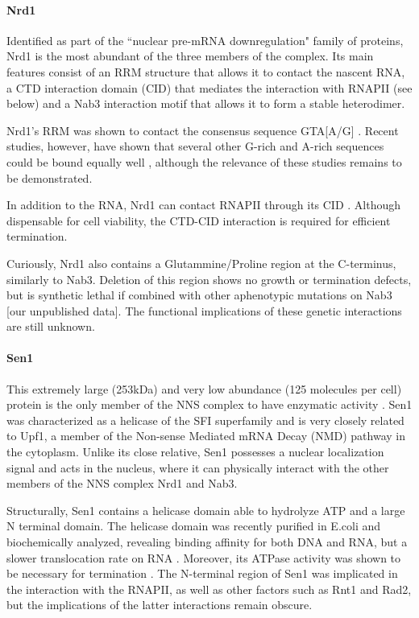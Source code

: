 \paragraph{Nrd1}

Identified as part of the ``nuclear pre-mRNA downregulation" family of proteins, Nrd1 is the most abundant of the three members of the complex. 
Its main features consist of an RRM structure that allows it to contact the nascent RNA, a CTD interaction domain (CID) that mediates the interaction with RNAPII (see below) and a Nab3 interaction motif that allows it to form a stable heterodimer.

Nrd1's RRM was shown \invivo{} to contact the consensus sequence GTA[A/G] \cite{steinmetz:1998:control}. 
Recent \invitro{} studies, however, have shown that several other G-rich and A-rich sequences could be bound equally well \citep{bacikova:2014:structure}, although the \invivo{} relevance of these studies remains to be demonstrated. 

In addition to the RNA, Nrd1 can contact RNAPII through its CID \cite{kubicek:2012:serine,vasiljeva:2008:nrd1nab3sen1}. 
Although dispensable for cell viability, the CTD-CID interaction is required for efficient termination.

Curiously, Nrd1 also contains a Glutammine/Proline region at the C-terminus, similarly to Nab3. 
Deletion of this region shows no growth or termination defects, but is synthetic lethal if combined with other aphenotypic mutations on Nab3 [our unpublished data]. 
The functional implications of these genetic interactions are still unknown.
 

\paragraph{Sen1}

This extremely large (253kDa) and very low abundance (125 molecules per cell) protein is the only member of the NNS complex to have enzymatic activity \cite{steinmetz:1996:repression}. 
Sen1 was characterized as a helicase of the SFI superfamily and is very closely related to Upf1, a member of the Non-sense Mediated mRNA Decay (NMD) pathway in the cytoplasm. 
Unlike its close relative, Sen1 possesses a nuclear localization signal and acts in the nucleus, where it can physically interact with the other members of the NNS complex Nrd1 and Nab3. 

Structurally, Sen1 contains a helicase domain able to hydrolyze ATP and a large N terminal domain. 
The helicase domain was recently purified in E.coli and biochemically analyzed, revealing binding affinity for both DNA and RNA, but a slower translocation rate on RNA \cite{martintumasz:2015:saccharomyces}. 
Moreover, its ATPase activity was shown to be necessary for termination \invitro{} \cite{porrua:2013:bacteriallike}. 
The N-terminal region of Sen1 was implicated in the interaction with the RNAPII, as well as other factors such as Rnt1 and Rad2, but the implications of the latter interactions remain obscure.


